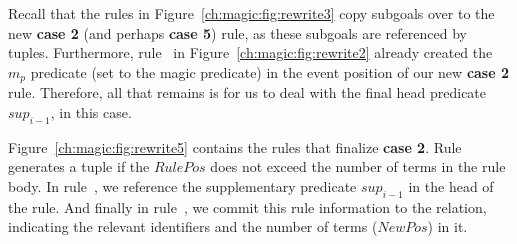 Recall that the rules in Figure~\ref{ch:magic:fig:rewrite3} copy subgoals over
to the new {\bf case 2} (and perhaps {\bf case 5}) rule, as these subgoals are
referenced by  tuples.  Furthermore, rule~ in
Figure~\ref{ch:magic:fig:rewrite2} already created the $m_p$ predicate (set to
the magic predicate) in the event position of our new {\bf case 2} rule.
Therefore, all that remains is for us to deal with the final head predicate
$sup_{i-1}$, in this case.

Figure~\ref{ch:magic:fig:rewrite5} contains the rules that finalize {\bf case
2}.  Rule~ generates a  tuple if the $RulePos$ does not
exceed the number of terms in the rule body.  In rule~, we reference
the supplementary predicate $sup_{i-1}$ in the head of the rule.  And finally
in rule~, we commit this rule information to the  relation,
indicating the relevant identifiers and the number of terms ($NewPos$) in it.

